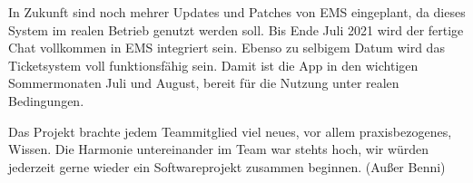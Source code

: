 In Zukunft sind noch mehrer Updates und Patches von EMS eingeplant, da dieses System im realen Betrieb genutzt werden soll. Bis Ende Juli 2021 wird der fertige Chat vollkommen
in EMS integriert sein. Ebenso zu selbigem Datum wird das Ticketsystem voll funktionsfähig sein. Damit ist die App in den wichtigen Sommermonaten Juli und August, bereit für
die Nutzung unter realen Bedingungen.

Das Projekt brachte jedem Teammitglied viel neues, vor allem praxisbezogenes, Wissen. Die Harmonie untereinander im Team war stehts hoch, wir würden jederzeit gerne wieder ein
Softwareprojekt zusammen beginnen. (Außer Benni)